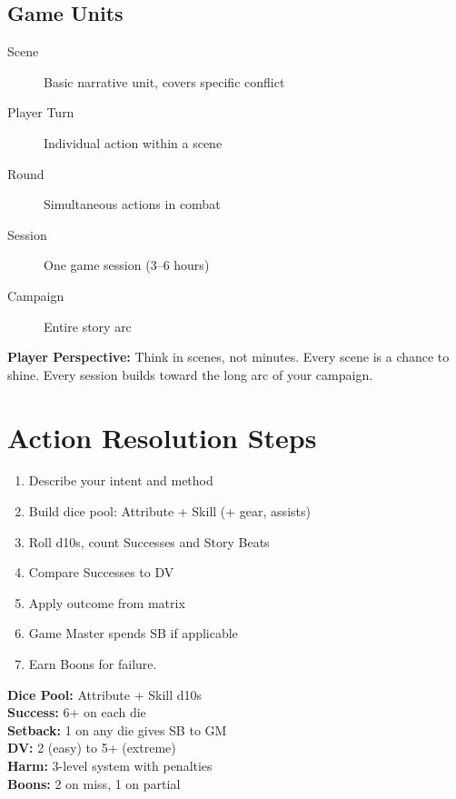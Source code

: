 \documentclass[11pt,twoside,openany]{book}
\begin{document}
\subsection*{Game Units}

\begin{description}
\item[Scene] Basic narrative unit, covers specific conflict
\item[Player Turn] Individual action within a scene
\item[Round] Simultaneous actions in combat
\item[Session] One game session (3--6 hours)
\item[Campaign] Entire story arc
\end{description}

\textbf{Player Perspective:} Think in scenes, not minutes. Every scene is a chance to shine. Every session builds toward the long arc of your campaign.

\section*{Action Resolution Steps} 

\begin{enumerate}
\item Describe your intent and method
\item Build dice pool: Attribute + Skill (+ gear, assists)
\item Roll d10s, count Successes and Story Beats
\item Compare Successes to DV
\item Apply outcome from matrix
\item Game Master spends SB if applicable
\item Earn Boons for failure.
\end{enumerate}

\begin{tcolorbox}[colback=gray!5!white, colframe=gray!75!black, title=Quick Reference, fonttitle=\bfseries,breakable]
\textbf{Dice Pool:} Attribute + Skill d10s\\
\textbf{Success:} 6+ on each die\\
\textbf{Setback:} 1 on any die gives SB to GM\\
\textbf{DV:} 2 (easy) to 5+ (extreme)\\
\textbf{Harm:} 3-level system with penalties\\
\textbf{Boons:} 2 on miss, 1 on partial
\end{tcolorbox}
\end{document}
